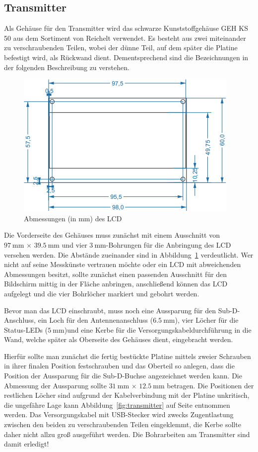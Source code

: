 \documentclass[paper=a4, parskip, numbers=noenddot, toc=listof, headsepline]{scrbook}
\begin{document}
			\subsection{Transmitter}
				Als Gehäuse für den Transmitter wird das schwarze Kunststoffgehäuse GEH KS 50 aus dem Sortiment von Reichelt verwendet. Es besteht aus zwei miteinander zu verschraubenden Teilen, wobei der dünne Teil, auf dem später die Platine befestigt wird, als Rückwand dient. Dementsprechend sind die Bezeichnungen in der folgenden Beschreibung zu verstehen.

				\begin{figure}
					\centering
					\includegraphics[]{bilder/lcddimensions}
					\caption{Abmessungen (in mm) des LCD}
					\label{fig:lcddimensions}
				\end{figure}

				Die Vorderseite des Gehäuses muss zunächst mit einem Ausschnitt von $\SI{97}{\milli\metre}\,\times\,\SI{39,5}{\milli\metre}$ und vier $\SI{3}{\milli\metre}$-Bohrungen für die Anbringung des LCD versehen werden. Die Abstände zueinander sind in Abbildung~\ref{fig:lcddimensions} verdeutlicht. Wer nicht auf seine Messkünste vertrauen möchte oder ein LCD mit abweichenden Abmessungen besitzt, sollte zunächst einen passenden Ausschnitt für den Bildschirm mittig in der Fläche anbringen, anschließend können das LCD aufgelegt und die vier Bohrlöcher markiert und gebohrt werden.

				Bevor man das LCD einschraubt, muss noch eine Aussparung für den Sub-D-Anschluss, ein Loch für den Antennenanschluss ($\SI{6,5}{\milli\metre}$), vier Löcher für die Status-LEDs ($\SI{5}{\milli\metre}$)und eine Kerbe für die Versorgungskabeldurchführung in die Wand, welche später als Oberseite des Gehäuses dient, eingebracht werden.

				Hierfür sollte man zunächst die fertig bestückte Platine mittels zweier Schrauben in ihrer finalen Position festschrauben und das Oberteil so anlegen, dass die Position der Aussparung für die Sub-D-Buchse angezeichnet werden kann. Die Abmessung der Aussparung sollte $\SI{31}{\milli\metre}\,\times\,\SI{12,5}{\milli\metre}$ betragen. Die Positionen der restlichen Löcher sind aufgrund der Kabelverbindung mit der Platine unkritisch, die ungefähre Lage kann Abbildung~\ref{fig:transmitter} auf Seite \pageref{fig:transmitter} entnommen werden. Das Versorgungskabel mit USB-Stecker wird zwecks Zugentlastung zwischen den beiden zu verschraubenden Teilen eingeklemmt, die Kerbe sollte daher nicht allzu groß ausgeführt werden. Die Bohrarbeiten am Transmitter sind damit erledigt!
\end{document}
